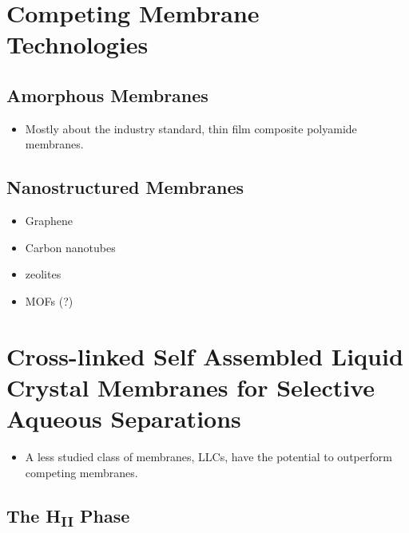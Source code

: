   \section{Competing Membrane Technologies}

  \subsection{Amorphous Membranes}
  
  \begin{itemize}  
  
  \item Mostly about the industry standard, thin film composite polyamide membranes.
  
  \end{itemize}
  
  \subsection{Nanostructured Membranes}
  
  \begin{itemize}  
  
  \item Graphene
  \item Carbon nanotubes
  \item zeolites
  \item MOFs (?) %
  \end{itemize}
  
  \section{Cross-linked Self Assembled Liquid Crystal Membranes for Selective Aqueous Separations}
  
  \begin{itemize}    
  
  \item A less studied class of membranes, LLCs, have the potential to outperform competing membranes.
  \end{itemize}
  
  \subsection{The H\textsubscript{II} Phase}
  

